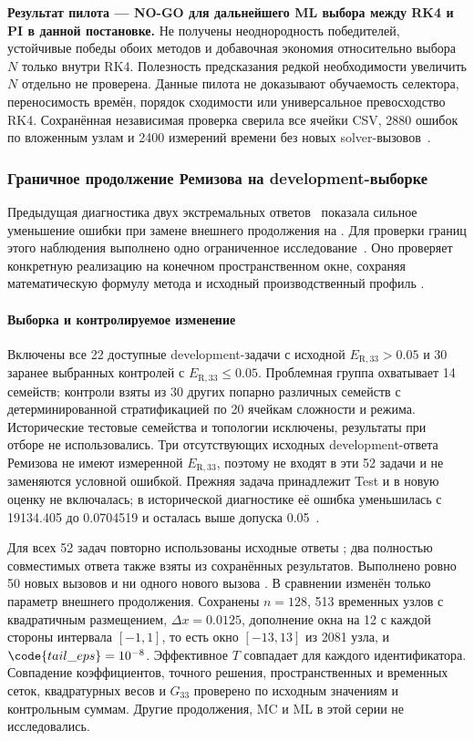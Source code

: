 \textbf{Результат пилота --- NO-GO для дальнейшего ML выбора между RK4
и PI в данной постановке.} Не получены неоднородность победителей,
устойчивые победы обоих методов и добавочная экономия относительно
выбора $N$ только внутри RK4. Полезность предсказания редкой необходимости
увеличить $N$ отдельно не проверена. Данные пилота не доказывают
обучаемость селектора, переносимость времён, порядок сходимости или
универсальное превосходство RK4. Сохранённая независимая проверка
сверила все ячейки CSV, 2880 ошибок по вложенным узлам и 2400 измерений
времени без новых solver-вызовов~\cite{savedcost60}.

\clearpage
\subsubsection{Граничное продолжение Ремизова на development-выборке}
\label{sec:boundarydev}

Предыдущая диагностика двух экстремальных ответов~\cite{savedboundary}
показала сильное уменьшение ошибки при замене внешнего продолжения
 на . Для проверки границ этого
наблюдения выполнено одно ограниченное исследование~\cite{savedboundarydev}.
Оно проверяет конкретную реализацию на конечном пространственном окне,
сохраняя математическую формулу метода и исходный производственный
профиль .

\paragraph{Выборка и контролируемое изменение\\}
Включены все 22 доступные development-задачи с исходной
$E_{\mathrm{R},33}>0.05$ и 30 заранее выбранных контролей с
$E_{\mathrm{R},33}\le0.05$. Проблемная группа охватывает 14 семейств;
контроли взяты из 30 других попарно различных семейств с
детерминированной стратификацией по 20 ячейкам сложности и режима.
Исторические тестовые семейства и топологии исключены, результаты
 при отборе не использовались. Три отсутствующих исходных
development-ответа Ремизова не имеют измеренной $E_{\mathrm{R},33}$,
поэтому не входят в эти 52 задачи и не заменяются условной ошибкой.
Прежняя задача  принадлежит Test и в новую оценку не
включалась; в исторической диагностике её ошибка уменьшилась с
19134.405 до 0.0704519 и осталась выше допуска 0.05~\cite{savedboundary}.

Для всех 52 задач повторно использованы исходные ответы ;
два полностью совместимых ответа  также взяты из сохранённых
результатов. Выполнено ровно 50 новых вызовов  и ни одного
нового вызова . В сравнении изменён только параметр внешнего
продолжения. Сохранены $n=128$, 513 временных узлов с квадратичным
размещением, $\Delta x=0.0125$, дополнение окна на 12 с каждой стороны
интервала $[-1,1]$, то есть окно $[-13,13]$ из 2081 узла,
и $\code{tail\_eps}=10^{-8}$. Эффективное $T$ совпадает для каждого
идентификатора. Совпадение коэффициентов, точного решения,
пространственных и временных сеток, квадратурных весов и $G_{33}$
проверено по исходным значениям и контрольным суммам. Другие продолжения,
MC и ML в этой серии не исследовались.


